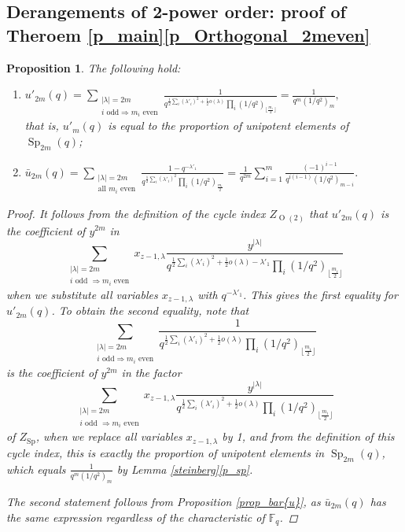 \documentclass[a4paper, 12pt, oneside]{amsart}
\newtheorem{prop}{Proposition}[section]
\theoremstyle{definition}
\DeclareMathOperator{\Sp}{Sp}
\DeclareMathOperator{\Or}{O}
\begin{document}
\subsection{Derangements of 2-power order: proof of Theroem \ref{p_main}\eqref{p_Orthogonal_2meven}}
\begin{prop}
\label{u'_2m(q)orth}
The following hold:
\begin{enumerate}[label=\roman*.]
    \item 
$\displaystyle u'_{2m}(q)=\sum_{\substack{|\lambda|=2m\\i \text{ odd}\Rightarrow m_i \text{ even}}}\frac{1}{q^{\frac{1}{2}\sum_i (\lambda'_i)^2+\frac{1}{2}o(\lambda)}\prod_i(1/q^2)_{\lfloor\frac{m_i}{2}\rfloor}}=\frac{1}{q^m(1/q^2)_m},$ \\
that is, $u'_m(q)$ is equal to the proportion of unipotent elements of $\Sp_{2m}(q)$;
\item 
$\displaystyle
\bar{u}_{2m}(q)=\sum_{\substack{|\lambda|=2m\\ \text{all }m_i \text{ even}}}\frac{1-q^{-\lambda'_1}}{q^{\frac{1}{2}\sum_i (\lambda'_i)^2}\prod_i(1/q^2)_{\frac{m_i}{2}}}=\frac{1}{q^{2m}}\sum_{i=1}^{m}\frac{(-1)^{i-1}}{q^{i(i-1)}(1/q^2)_{m-i}}.$
\end{enumerate}
\begin{proof}
It follows from the definition of the cycle index $Z_{\Or(2)}$ that $u'_{2m}(q)$ is the coefficient of $y^{2m}$ in 
$$\sum_{\substack{|\lambda|=2m\\ i \text{ odd }\Rightarrow m_i \text{ even}}}x_{z-1,\lambda}\frac{y^{|\lambda|}}{q^{\frac{1}{2}\sum_i(\lambda'_i)^2+\frac{1}{2}o(\lambda)-\lambda'_1}\prod_i(1/q^2)_{\lfloor\frac{m_i}{2}\rfloor}}$$
when we substitute all variables $x_{z-1,\lambda}$ with $q^{-\lambda'_1}$. This gives the first equality for $u'_{2m}(q)$. To obtain the second equality, note that
$$\sum_{\substack{|\lambda|=2m\\i \text{ odd}\Rightarrow m_i \text{ even}}}\frac{1}{q^{\frac{1}{2}\sum_i (\lambda'_i)^2+\frac{1}{2}o(\lambda)}\prod_i(1/q^2)_{\lfloor\frac{m_i}{2}\rfloor}}$$
is the coefficient of $y^{2m}$ in the factor
$$\sum_{\substack{|\lambda|=2m\\ i \text{ odd }\Rightarrow m_i \text{ even}}}x_{z-1,\lambda}\frac{y^{|\lambda|}}{q^{\frac{1}{2}\sum_i(\lambda'_i)^2+\frac{1}{2}o(\lambda)
}\prod_i(1/q^2)_{\lfloor\frac{m_i}{2}\rfloor}}$$
of $Z_{\Sp}$, when we replace all variables $x_{z-1,\lambda}$ by 1, and from the definition of this cycle index, this is exactly the proportion of unipotent elements in $\Sp_{2m}(q)$, which equals $\frac{1}{q^m(1/q^2)_m}$ by Lemma \ref{steinberg}\eqref{p_sp}.

The second statement follows from Proposition \ref{prop_bar{u}}, as  $\bar{u}_{2m}(q)$ has the same expression regardless of the characteristic of $\mathbb{F}_q$.
\end{proof}
\end{prop}
\end{document}
